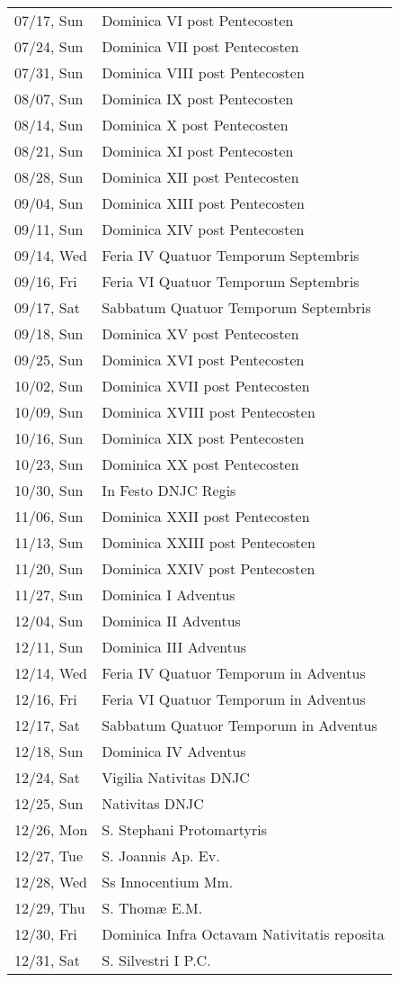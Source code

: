 \documentclass{article}
\begin{document}
\begin{longtable}{ll}
07/17, Sun & Dominica VI post Pentecosten\\
07/24, Sun & Dominica VII post Pentecosten\\
07/31, Sun & Dominica VIII post Pentecosten\\
08/07, Sun & Dominica IX post Pentecosten\\
08/14, Sun & Dominica X post Pentecosten\\
08/21, Sun & Dominica XI post Pentecosten\\
08/28, Sun & Dominica XII post Pentecosten\\
09/04, Sun & Dominica XIII post Pentecosten\\
09/11, Sun & Dominica XIV post Pentecosten\\
09/14, Wed & Feria IV Quatuor Temporum Septembris\\
09/16, Fri & Feria VI Quatuor Temporum Septembris\\
09/17, Sat & Sabbatum Quatuor Temporum Septembris\\
09/18, Sun & Dominica XV post Pentecosten\\
09/25, Sun & Dominica XVI post Pentecosten\\
10/02, Sun & Dominica XVII post Pentecosten\\
10/09, Sun & Dominica XVIII post Pentecosten\\
10/16, Sun & Dominica XIX post Pentecosten\\
10/23, Sun & Dominica XX post Pentecosten\\
10/30, Sun & In Festo DNJC Regis\\
11/06, Sun & Dominica XXII post Pentecosten\\
11/13, Sun & Dominica XXIII post Pentecosten\\
11/20, Sun & Dominica XXIV post Pentecosten\\
11/27, Sun & Dominica I Adventus\\
12/04, Sun & Dominica II Adventus\\
12/11, Sun & Dominica III Adventus\\
12/14, Wed & Feria IV Quatuor Temporum in Adventus\\
12/16, Fri & Feria VI Quatuor Temporum in Adventus\\
12/17, Sat & Sabbatum Quatuor Temporum in Adventus\\
12/18, Sun & Dominica IV Adventus\\
12/24, Sat & Vigilia Nativitas DNJC\\
12/25, Sun & Nativitas DNJC\\
12/26, Mon & S. Stephani Protomartyris\\
12/27, Tue & S. Joannis Ap. Ev.\\
12/28, Wed & Ss Innocentium Mm.\\
12/29, Thu & S. Thomæ E.M.\\
12/30, Fri & Dominica Infra Octavam Nativitatis reposita\\
12/31, Sat & S. Silvestri I P.C.\\
\end{longtable}
\end{document}

